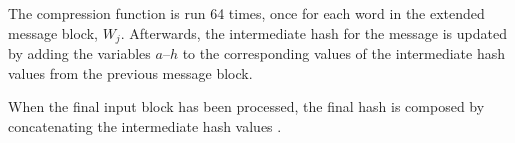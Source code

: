 The compression function is run 64 times, once for each word in the extended message block,
$W_j$. Afterwards, the intermediate hash for the message is updated by adding the
variables $a$--$h$ to the corresponding values of the intermediate hash values from
the previous message block.

When the final input block has been processed, the final hash is composed by
concatenating the intermediate hash values \cite{sha-spec}.
